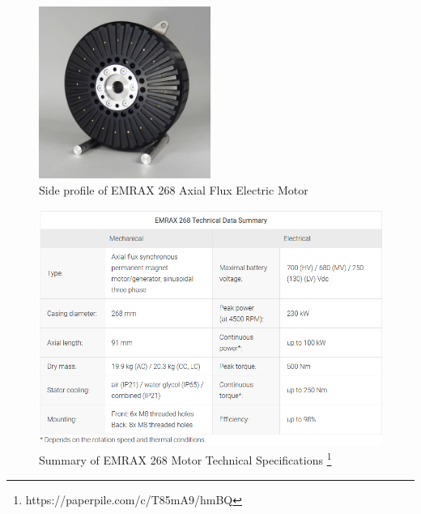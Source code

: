 \documentclass[main.tex]{subfiles}
\begin{document}
    \begin{figure}
        \centering
        \includegraphics[width=0.5\textwidth]{images/fig4}
        \caption{Side profile of EMRAX 268 Axial Flux Electric Motor}
        \label{fig:emrax-profile}
    \end{figure}
    \begin{figure}
        \centering
        \includegraphics[width=\textwidth]{images/fig5}
        \caption{Summary of EMRAX 268 Motor Technical Specifications \protect\footnote{https://paperpile.com/c/T85mA9/hmBQ}}
        \label{tab:emrax-specs}
    \end{figure}
\end{document}
